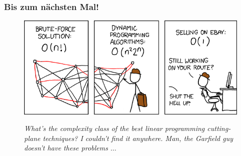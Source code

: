 \begin{frame}
	\frametitle{Bis zum nächsten Mal!}
	
	\begin{figure}[H]
		\includegraphics[width= \textwidth]{images/399_traveling_salesman}
		
		\textit{\scriptsize{What's the complexity class of the best linear programming cutting-plane techniques? I couldn't find it anywhere. Man, the Garfield guy doesn't have these problems $\ldots$}}
	\end{figure}
\end{frame}

